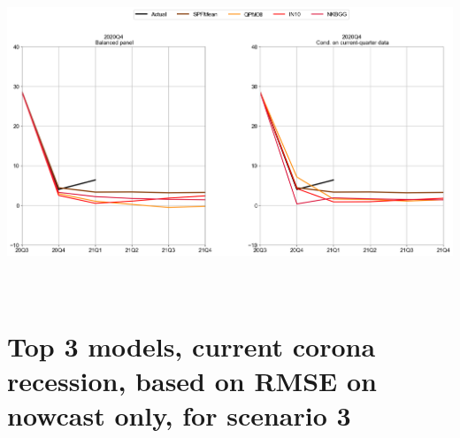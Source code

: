 \documentclass{article}
\begin{document}
\includegraphics[scale=0.5]{Top3_models_BP_2020Q4}\\ \bigskip \\ \bigskip  \\

\pagebreak
\section{\Large Top 3 models, current corona recession, based on RMSE on nowcast only, for scenario 3}
\end{document}
